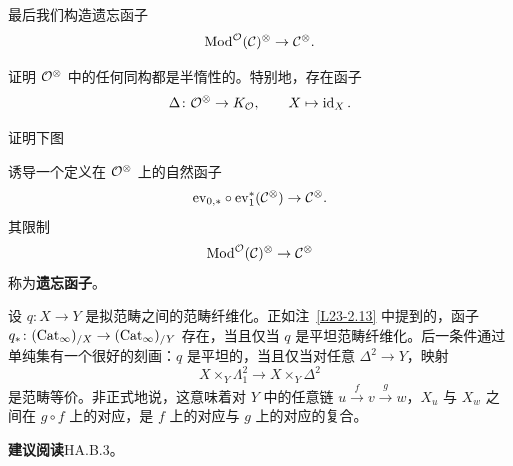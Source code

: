 \nitem\label{L23-3.10} 最后我们构造遗忘函子
\[
\operatorname{Mod}^{\mathcal{O}}(\mathcal{C})^{\otimes}\to\mathcal{C}^{\otimes}.
\]

\begin{exercise}\label{L23-3.11}
证明 $\mathcal{O}^{\otimes}$ 中的任何同构都是半惰性的。特别地，存在函子
\[
\Delta\colon\mathcal{O}^{\otimes}\to K_{\mathcal{O}},\qquad X\mapsto\operatorname{id}_{X}.
\]
\end{exercise}

\begin{exercise}\label{L23-3.12}
证明下图
\begin{center}
\end{center}
诱导一个定义在 $\mathcal{O}^{\otimes}$ 上的自然函子
\[
\mathrm{ev}_{0,*}\circ\mathrm{ev}_{1}^{*}(\mathcal{C}^{\otimes})\to\mathcal{C}^{\otimes}.
\]
其限制
\[
\operatorname{Mod}^{\mathcal{O}}(\mathcal{C})^{\otimes}\to\mathcal{C}^{\otimes}
\]
称为\textbf{遗忘函子}。
\end{exercise}


\nitem\label{L23-A.1} 设 $q\colon X\to Y$ 是拟范畴之间的范畴纤维化。正如注~\ref{L23-2.13} 中提到的，函子 $q_{*}\colon(\operatorname{Cat}_{\infty})_{/X}\to(\operatorname{Cat}_{\infty})_{/Y}$ 存在，当且仅当 $q$ 是平坦范畴纤维化。后一条件通过单纯集有一个很好的刻画：$q$ 是平坦的，当且仅当对任意 $\Delta^{2}\to Y$，映射
\[
X\times_{Y}\Lambda^{2}_{1}\to X\times_{Y}\Delta^{2}
\]
是范畴等价。非正式地说，这意味着对 $Y$ 中的任意链 $u\xrightarrow{f}v\xrightarrow{g}w$，$X_{u}$ 与 $X_{w}$ 之间在 $g\circ f$ 上的对应，是 $f$ 上的对应与 $g$ 上的对应的复合。

\nitem\label{L23-A.2} \textbf{建议阅读}\quad HA.B.3。
